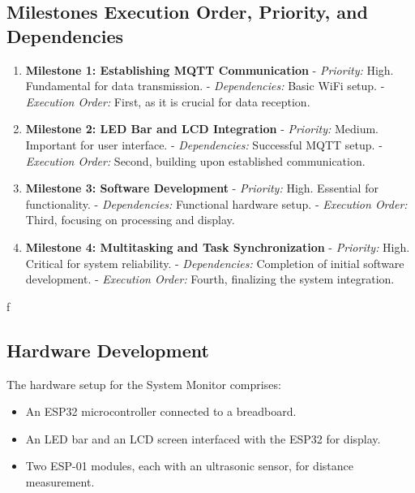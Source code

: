 \documentclass{article}
\begin{document}
\subsection{Milestones Execution Order, Priority, and Dependencies}
\begin{enumerate}
    \item \textbf{Milestone 1: Establishing MQTT Communication}
       - \textit{Priority:} High. Fundamental for data transmission.
       - \textit{Dependencies:} Basic WiFi setup.
       - \textit{Execution Order:} First, as it is crucial for data reception.

    \item \textbf{Milestone 2: LED Bar and LCD Integration}
       - \textit{Priority:} Medium. Important for user interface.
       - \textit{Dependencies:} Successful MQTT setup.
       - \textit{Execution Order:} Second, building upon established communication.

    \item \textbf{Milestone 3: Software Development}
       - \textit{Priority:} High. Essential for functionality.
       - \textit{Dependencies:} Functional hardware setup.
       - \textit{Execution Order:} Third, focusing on processing and display.

    \item \textbf{Milestone 4: Multitasking and Task Synchronization}
       - \textit{Priority:} High. Critical for system reliability.
       - \textit{Dependencies:} Completion of initial software development.
       - \textit{Execution Order:} Fourth, finalizing the system integration.
\end{enumerate}ƒ

\subsection{Hardware Development}
The hardware setup for the System Monitor comprises:
\begin{itemize}
    \item An ESP32 microcontroller connected to a breadboard.
    \item An LED bar and an LCD screen interfaced with the ESP32 for display.
    \item Two ESP-01 modules, each with an ultrasonic sensor, for distance measurement.
\end{itemize}
\end{document}

